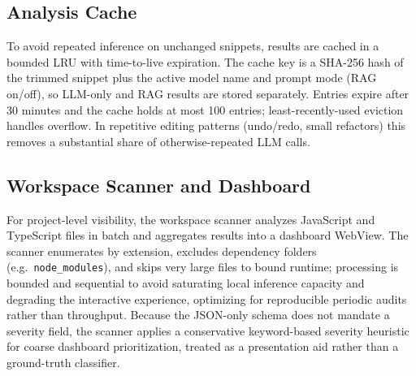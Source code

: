 \subsection{Analysis Cache}
\label{subsec:impl-cache}

To avoid repeated inference on unchanged snippets, results are cached in a bounded LRU with time-to-live expiration. The cache key is a SHA-256 hash of the trimmed snippet plus the active model name and prompt mode (RAG on/off), so LLM-only and RAG results are stored separately. Entries expire after 30 minutes and the cache holds at most 100 entries; least-recently-used eviction handles overflow. In repetitive editing patterns (undo/redo, small refactors) this removes a substantial share of otherwise-repeated LLM calls.

\subsection{Workspace Scanner and Dashboard}
\label{subsec:impl-workspace}

For project-level visibility, the workspace scanner analyzes JavaScript and TypeScript files in batch and aggregates results into a dashboard WebView. The scanner enumerates by extension, excludes dependency folders (e.g.\ \texttt{node\_modules}), and skips very large files to bound runtime; processing is bounded and sequential to avoid saturating local inference capacity and degrading the interactive experience, optimizing for reproducible periodic audits rather than throughput. Because the JSON-only schema does not mandate a severity field, the scanner applies a conservative keyword-based severity heuristic for coarse dashboard prioritization, treated as a presentation aid rather than a ground-truth classifier.


